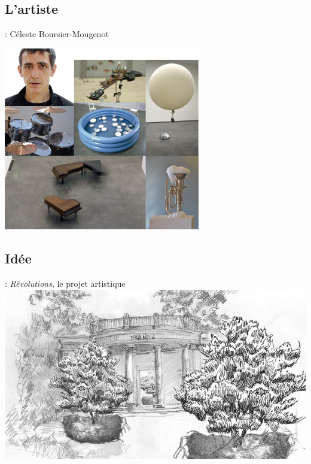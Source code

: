 \documentclass[12pt]{beamer}
\begin{document}
        \subsection{L’artiste}
            \begin{frame}{\subsecname: Céleste Boursier-Mougenot}
                \vspace{-0.4cm}
                \begin{center}
                    \includegraphics[height=8cm]{img/celeste2.jpg}
                \end{center}
            \end{frame}

        \subsection{Idée}
            \begin{frame}{\subsecname: \textit{Rêvolutions}, le projet artistique}
                \includegraphics[width=\linewidth]{img/vue_artiste.jpg}
            \end{frame}
\end{document}
